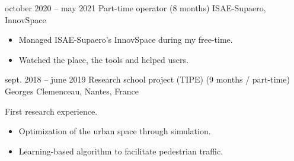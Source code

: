 \documentclass[
    a4paper,
]{fortysecondscv}
\begin{document}
    \cvsignature

    \newpage

    \makebacksidebar

        \begin{cvtable}[2]
            \cvitem
                {october 2020 -- may 2021}
                {Part-time operator \newline (8 months)}
                {ISAE-Supaero, InnovSpace}
                {
                    \begin{itemize}
                        \item Managed ISAE-Supaero's InnovSpace during my free-time.
                        \item Watched the place, the tools and helped users.
                    \end{itemize}
                }
            \cvitem
               {sept. 2018 -- june 2019}
               {Research school project (TIPE) \newline (9 months / part-time)}
               {Georges Clemenceau, Nantes, France}
                {
                   First research experience.
                   \begin{itemize}
                       \item Optimization of the urban space through simulation.
                       \item Learning-based algorithm to facilitate pedestrian traffic.
                   \end{itemize}
               }
        \end{cvtable}
\end{document}
